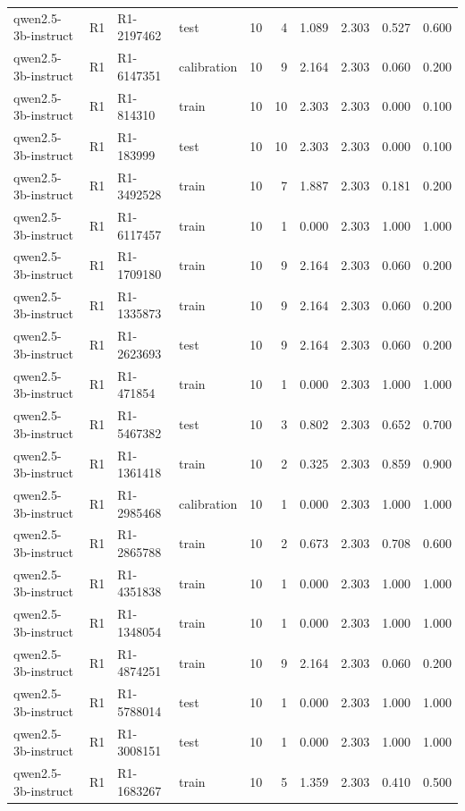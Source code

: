 \begin{table}
\begin{tabular}{llllrrrrrr}
qwen2.5-3b-instruct & R1 & R1-2197462 & test & 10 & 4 & 1.089 & 2.303 & 0.527 & 0.600 \\
qwen2.5-3b-instruct & R1 & R1-6147351 & calibration & 10 & 9 & 2.164 & 2.303 & 0.060 & 0.200 \\
qwen2.5-3b-instruct & R1 & R1-814310 & train & 10 & 10 & 2.303 & 2.303 & 0.000 & 0.100 \\
qwen2.5-3b-instruct & R1 & R1-183999 & test & 10 & 10 & 2.303 & 2.303 & 0.000 & 0.100 \\
qwen2.5-3b-instruct & R1 & R1-3492528 & train & 10 & 7 & 1.887 & 2.303 & 0.181 & 0.200 \\
qwen2.5-3b-instruct & R1 & R1-6117457 & train & 10 & 1 & 0.000 & 2.303 & 1.000 & 1.000 \\
qwen2.5-3b-instruct & R1 & R1-1709180 & train & 10 & 9 & 2.164 & 2.303 & 0.060 & 0.200 \\
qwen2.5-3b-instruct & R1 & R1-1335873 & train & 10 & 9 & 2.164 & 2.303 & 0.060 & 0.200 \\
qwen2.5-3b-instruct & R1 & R1-2623693 & test & 10 & 9 & 2.164 & 2.303 & 0.060 & 0.200 \\
qwen2.5-3b-instruct & R1 & R1-471854 & train & 10 & 1 & 0.000 & 2.303 & 1.000 & 1.000 \\
qwen2.5-3b-instruct & R1 & R1-5467382 & test & 10 & 3 & 0.802 & 2.303 & 0.652 & 0.700 \\
qwen2.5-3b-instruct & R1 & R1-1361418 & train & 10 & 2 & 0.325 & 2.303 & 0.859 & 0.900 \\
qwen2.5-3b-instruct & R1 & R1-2985468 & calibration & 10 & 1 & 0.000 & 2.303 & 1.000 & 1.000 \\
qwen2.5-3b-instruct & R1 & R1-2865788 & train & 10 & 2 & 0.673 & 2.303 & 0.708 & 0.600 \\
qwen2.5-3b-instruct & R1 & R1-4351838 & train & 10 & 1 & 0.000 & 2.303 & 1.000 & 1.000 \\
qwen2.5-3b-instruct & R1 & R1-1348054 & train & 10 & 1 & 0.000 & 2.303 & 1.000 & 1.000 \\
qwen2.5-3b-instruct & R1 & R1-4874251 & train & 10 & 9 & 2.164 & 2.303 & 0.060 & 0.200 \\
qwen2.5-3b-instruct & R1 & R1-5788014 & test & 10 & 1 & 0.000 & 2.303 & 1.000 & 1.000 \\
qwen2.5-3b-instruct & R1 & R1-3008151 & test & 10 & 1 & 0.000 & 2.303 & 1.000 & 1.000 \\
qwen2.5-3b-instruct & R1 & R1-1683267 & train & 10 & 5 & 1.359 & 2.303 & 0.410 & 0.500 \\

\end{tabular}
\end{table}
